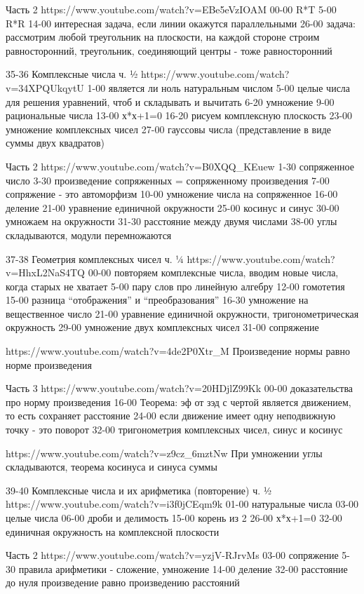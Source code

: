 Часть 2
https://www.youtube.com/watch?v=EBe5eVzIOAM
00-00 R*T
5-00 R*R
14-00 интересная задача, если линии окажутся параллельными
26-00 задача: рассмотрим любой треугольник на плоскости, на каждой стороне строим равносторонний, треугольник, соединяющий центры - тоже равносторонний

35-36
Комплексные числа ч. ½
https://www.youtube.com/watch?v=34XPQUkqytU
1-00 является ли ноль натуральным числом
5-00 целые числа для решения уравнений, чтоб и складывать и вычитать
6-20 умножение
9-00 рациональные числа
13-00 х*х+1=0
16-20 рисуем комплексную плоскость
23-00 умножение комплексных чисел
27-00 гауссовы числа (представление в виде суммы двух квадратов)

Часть 2
https://www.youtube.com/watch?v=B0XQQ_KEuew
1-30 сопряженное число
3-30 произведение сопряженных = сопряженному произведения
7-00 сопряжение - это автоморфизм
10-00 умножение числа на сопряженное
16-00 деление
21-00 уравнение единичной окружности
25-00 косинус и синус
30-00 умножаем на окружности
31-30 расстояние между двумя числами
38-00 углы складываются, модули перемножаются


37-38
Геометрия комплексных чисел ч. ¼
https://www.youtube.com/watch?v=HhxL2NaS4TQ
00-00 повторяем комплексные числа, вводим новые числа, когда старых не хватает
5-00 пару слов про линейную алгебру
12-00 гомотетия
15-00 разница “отображения” и “преобразования”
16-30 умножение на вещественное число
21-00 уравнение единичной окружности, тригонометрическая окружность
29-00 умножение двух комплексных чисел
31-00 сопряжение

https://www.youtube.com/watch?v=4de2P0Xtr_M
Произведение нормы равно норме произведения

Часть 3
https://www.youtube.com/watch?v=20HDjlZ99Kk
00-00 доказательства про норму произведения
16-00 Теорема: эф от зэд с чертой является движением, то есть сохраняет расстояние
24-00 если движение имеет одну неподвижную точку - это поворот
32-00 тригонометрия комплексных чисел, синус и косинус

https://www.youtube.com/watch?v=z9cz_6mztNw
При умножении углы складываются, теорема косинуса и синуса суммы

39-40
Комплексные числа и их арифметика (повторение) ч. ½
https://www.youtube.com/watch?v=i3f0jCEqm9k
01-00 натуральные числа
03-00 целые числа
06-00 дроби и делимость
15-00 корень из 2
26-00 х*х+1=0
32-00 единичная окружность на комплексной плоскости

Часть 2
https://www.youtube.com/watch?v=yzjV-RJrvMs
03-00 сопряжение
5-30 правила арифметики - сложение, умножение
14-00 деление
32-00 расстояние до нуля произведение равно произведению расстояний

